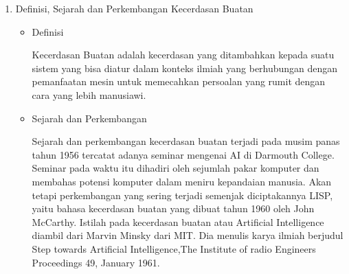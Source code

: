 \begin{enumerate}
\item Definisi, Sejarah dan Perkembangan Kecerdasan Buatan
\begin{itemize}
\item Definisi
\par
Kecerdasan Buatan adalah kecerdasan yang ditambahkan kepada suatu sistem yang bisa diatur dalam konteks ilmiah yang berhubungan dengan pemanfaatan mesin untuk memecahkan persoalan yang rumit dengan cara yang lebih manusiawi. 
\par
\item Sejarah dan Perkembangan
\par
Sejarah dan perkembangan kecerdasan buatan terjadi pada musim panas tahun 1956 tercatat adanya seminar mengenai AI di Darmouth College. Seminar pada waktu itu dihadiri oleh sejumlah pakar komputer dan membahas potensi komputer dalam meniru kepandaian manusia. Akan tetapi perkembangan yang sering terjadi semenjak diciptakannya LISP, yaitu bahasa kecerdasan buatan yang dibuat tahun 1960 oleh John McCarthy. Istilah pada kecerdasan buatan atau Artificial Intelligence diambil dari Marvin Minsky dari MIT. Dia menulis karya ilmiah berjudul Step towards Artificial Intelligence,The Institute of radio Engineers Proceedings 49, January 1961.
\end{itemize}


\end{enumerate}
